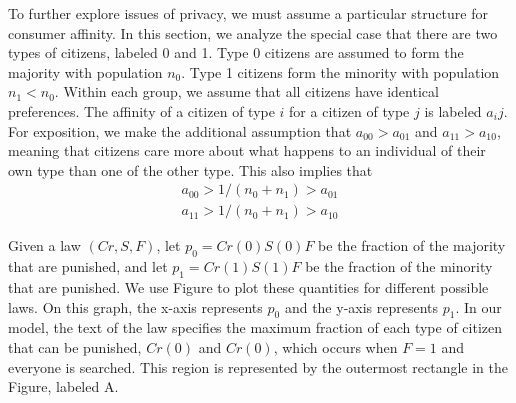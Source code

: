 To further explore issues of privacy, we must assume a particular structure for consumer affinity.  In this section, we analyze the special case that there are two types of citizens, labeled 0 and 1.  Type 0 citizens are assumed to form the majority with population $n_0$.  Type 1 citizens form the minority with population $n_1 < n_0$.  Within each group, we assume that all citizens have identical preferences.  The affinity of a citizen of type $i$ for a citizen of type $j$ is labeled $a_ij$.  For exposition, we make the additional assumption that $a_{00} > a_{01}$ and $a_{11} > a_{10}$, meaning that citizens care more about what happens to an individual of their own type than one of the other type.  This also implies that 
\begin{align}
a_{00} > 1/(n_0 + n_1) > a_{01} \\
a_{11} > 1/(n_0 + n_1) >  a_{10}
\end{align}

Given a law $(Cr, S, F)$, let $p_0 = Cr(0)S(0)F$ be the fraction of the majority that are punished, and let $p_1 = Cr(1)S(1)F$ be the fraction of the minority that are punished.  We use Figure  to plot these quantities for different possible laws.  On this graph, the x-axis represents $p_0$ and the y-axis represents $p_1$.  In our model, the text of the law specifies the maximum fraction of each type of citizen that can be punished, $Cr(0)$ and $Cr(0)$, which occurs when $F=1$ and everyone is searched.  This region is represented by the outermost rectangle in the Figure, labeled A.



